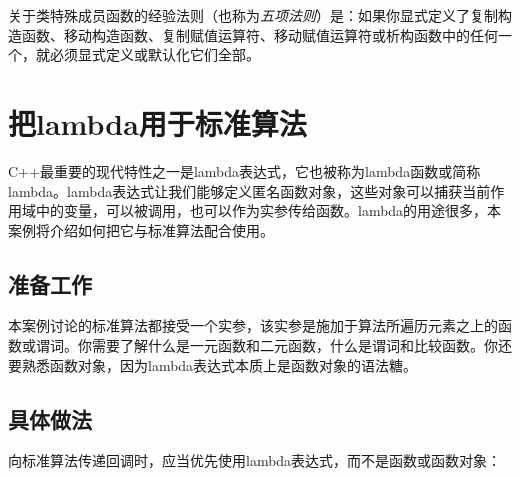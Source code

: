
\begin{myNote}
关于类特殊成员函数的经验法则（也称为\textit{五项法则}）是：如果你显式定义了复制构造函数、移动构造函数、复制赋值运算符、移动赋值运算符或析构函数中的任何一个，就必须显式定义或默认化它们全部。
\end{myNote}



\section{把lambda用于标准算法}



C++最重要的现代特性之一是lambda表达式，它也被称为lambda函数或简称lambda。lambda表达式让我们能够定义匿名函数对象，这些对象可以捕获当前作用域中的变量，可以被调用，也可以作为实参传给函数。lambda的用途很多，本案例将介绍如何把它与标准算法配合使用。



\subsection{准备工作}



本案例讨论的标准算法都接受一个实参，该实参是施加于算法所遍历元素之上的函数或谓词。你需要了解什么是一元函数和二元函数，什么是谓词和比较函数。你还要熟悉函数对象，因为lambda表达式本质上是函数对象的语法糖。



\subsection{具体做法}



向标准算法传递回调时，应当优先使用lambda表达式，而不是函数或函数对象：



